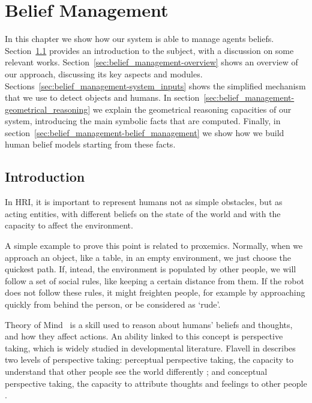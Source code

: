
\chapter{Belief Management} %

\label{chapter:belief_management} %


In this chapter we show how our system is able to manage agents beliefs. Section~\ref{sec:belief_management-intro} provides an introduction to the subject, with a discussion on some relevant works. Section~\ref{sec:belief_management-overview} shows an overview of our approach, discussing its key aspects and modules. Sections~\ref{sec:belief_management-system_inputs}  shows the simplified mechanism that we use to detect objects and humans. In section~\ref{sec:belief_management-geometrical_reasoning} we explain the geometrical reasoning capacities of our system, introducing the main symbolic facts that are computed. Finally, in section~\ref{sec:belief_management-belief_management} we show how we build human belief models starting from these facts.

\section{Introduction}
\label{sec:belief_management-intro}

In HRI, it is important to represent humans not as simple obstacles, but as acting entities, with different beliefs on the state of the world and with the capacity to affect the environment. 

A simple example to prove this point is related to proxemics. Normally, when we approach an object, like a table, in an empty environment, we just choose the quickest path. If, intead, the environment is populated by other people, we will follow a set of social rules, like keeping a certain distance from them. If the robot does not follow these rules, it might freighten people, for example by approaching quickly from behind the person, or be considered as `rude'.


Theory of Mind~\citep{premack1978does} is a skill used to reason about humans' beliefs and thoughts, and how they affect actions. An ability linked to this concept is perspective taking, which is widely studied in developmental literature.  Flavell in \cite{flavell1977development} describes two levels of perspective taking: 
perceptual perspective taking, the capacity to understand that other people see the world differently \citep{Tversky1999}; and conceptual perspective taking, the capacity to attribute thoughts and feelings to other people \citep{Baron1985}. 


